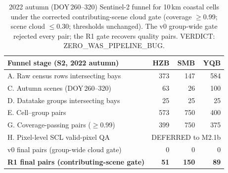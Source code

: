 \begin{table}[t]
\centering
\small
\caption{2022 autumn (DOY\,260--320) Sentinel-2 funnel for 10\,km
coastal cells under the corrected contributing-scene cloud gate
(coverage $\ge$0.99; scene cloud $\le$0.30; thresholds unchanged). The
v0 group-wide gate rejected every pair; the R1 gate recovers quality
pairs. VERDICT: ZERO\_WAS\_PIPELINE\_BUG.}
\label{tab:funnel}
\begin{tabular}{lrrr}
\toprule
Funnel stage (S2, 2022 autumn) & HZB & SMB & YQB \\
\midrule
A. Raw census rows intersecting bays & 373 & 147 & 584 \\
C. Autumn scenes (DOY\,260--320) & 63 & 26 & 100 \\
D. Datatake groups intersecting bays & 25 & 25 & 25 \\
E. Cell--group pairs & 573 & 750 & 400 \\
G. Coverage-passing pairs ($\ge$0.99) & 399 & 750 & 375 \\
H. Pixel-level SCL valid-pixel QA & \multicolumn{3}{c}{DEFERRED to M2.1b} \\
\quad v0 final pairs (group-wide cloud gate) & 0 & 0 & 0 \\
\quad \textbf{R1 final pairs (contributing-scene gate)} & \textbf{51} & \textbf{150} & \textbf{89} \\
\bottomrule
\end{tabular}
\end{table}
